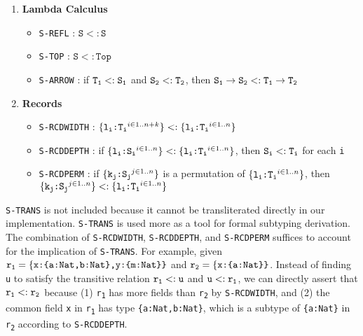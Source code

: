 \documentclass[fleqn, 11pt]{article}
\begin{document}
\begin{enumerate}
    \item \textbf{Lambda Calculus}
    \begin{itemize}
        \item \texttt{S-REFL} : $\texttt{S} <: \texttt{S}$ 
        \item \texttt{S-TOP} : $\texttt{S} <: \texttt{Top}$ 
        \item \texttt{S-ARROW} : if $\texttt{T\textsubscript{1}} <: \texttt{S\textsubscript{1}}$ and 
        $\texttt{S\textsubscript{2}} <: \texttt{T\textsubscript{2}}$, then 
        $\texttt{S\textsubscript{1}} \rightarrow \texttt{S\textsubscript{2}} <: \texttt{T\textsubscript{1}} \rightarrow \texttt{T\textsubscript{2}}$
    \end{itemize}

    \item \textbf{Records}
    \begin{itemize}
        \item \texttt{S-RCDWIDTH} : $\{\texttt{l\textsubscript{i}:T\textsubscript{i}}^{i \in 1..n+k}\} 
        <: \{\texttt{l\textsubscript{i}:T\textsubscript{i}}^{i \in 1..n}\}$
        \item \texttt{S-RCDDEPTH} : if $\{\texttt{l\textsubscript{i}:S\textsubscript{i}}^{i \in 1..n}\} 
        <: \{\texttt{l\textsubscript{i}:T\textsubscript{i}}^{i \in 1..n}\}$, then 
        $\texttt{S\textsubscript{i}} <: \texttt{T\textsubscript{i}}$ for each \texttt{i} 
        \item \texttt{S-RCDPERM} : if $\{\texttt{k\textsubscript{j}:S\textsubscript{j}}^{j \in 1..n}\}$ 
        is a permutation of $\{\texttt{l\textsubscript{i}:T\textsubscript{i}}^{i \in 1..n}\}$, then 
        $\{\texttt{k\textsubscript{j}:S\textsubscript{j}}^{j \in 1..n}\} <: \{\texttt{l\textsubscript{i}:T\textsubscript{i}}^{i \in 1..n}\}$
    \end{itemize}
\end{enumerate}

\texttt{S-TRANS} is not included because it cannot be transliterated directly in our implementation. \texttt{S-TRANS} is used more as a 
tool for formal subtyping derivation. The combination of \texttt{S-RCDWIDTH}, \texttt{S-RCDDEPTH}, and \texttt{S-RCDPERM} suffices to 
account for the implication of \texttt{S-TRANS}. For example, given 
$\texttt{r\textsubscript{1}} = \{\texttt{x:\{a:Nat,b:Nat\},y:\{m:Nat\}\}}$ and 
$\texttt{r\textsubscript{2}} = \{\texttt{x:\{a:Nat\}\}}$. Instead of finding \texttt{u} to satisfy the transitive relation 
$\texttt{r\textsubscript{1}} <: \texttt{u}$ and $ \texttt{u} <: \texttt{r\textsubscript{1}}$, we can 
directly assert that $\texttt{r\textsubscript{1}} <: \texttt{r\textsubscript{2}}$ because (1) \texttt{r\textsubscript{1}} has more fields 
than \texttt{r\textsubscript{2}} by \texttt{S-RCDWIDTH}, and (2) the common field \texttt{x} in \texttt{r\textsubscript{1}} has type \texttt{\{a:Nat,b:Nat\}},  
which is a subtype of \texttt{\{a:Nat\}} in \texttt{r\textsubscript{2}} according to \texttt{S-RCDDEPTH}.
\end{document}
